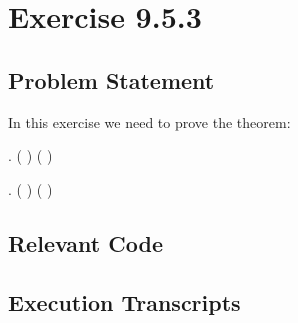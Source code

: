 \documentclass{report}
\begin{document}

 \chapter{Exercise 9.5.3}
 \label{cha:exercise-9.5.3}
  
 \section{Problem Statement}
 \label{sec:problem-statement-3}

In this exercise we need to prove the theorem:  

\HOLTokenTurnstile{} \HOLSymConst{\HOLTokenForall{}}   . ( \HOLSymConst{\HOLTokenImp{}} ) \HOLSymConst{\HOLTokenConj{}} ( \HOLSymConst{\HOLTokenImp{}} ) \HOLSymConst{\HOLTokenImp{}}  \HOLSymConst{\HOLTokenDisj{}}  \HOLSymConst{\HOLTokenImp{}}  \HOLSymConst{\HOLTokenDisj{}} 

\HOLTokenTurnstile{} \HOLSymConst{\HOLTokenForall{}}   . ( \HOLSymConst{\HOLTokenImp{}} ) \HOLSymConst{\HOLTokenConj{}} ( \HOLSymConst{\HOLTokenImp{}} ) \HOLSymConst{\HOLTokenImp{}}  \HOLSymConst{\HOLTokenDisj{}}  \HOLSymConst{\HOLTokenImp{}}  \HOLSymConst{\HOLTokenDisj{}} 

\section{Relevant Code}
\label{sec:relevant-code-3}


\section{Execution Transcripts}
\label{sec:exec-transcr-3}
\end{document}
